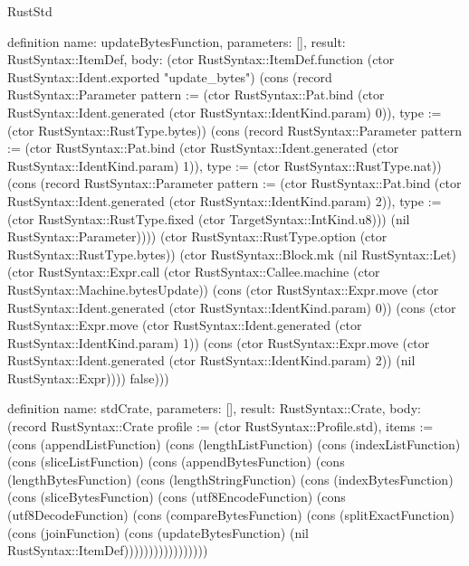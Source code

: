 \begin{lexlean}{RustStd}
\begin{semanticmodule}
definition{
  name: updateBytesFunction,
  parameters: [],
  result: RustSyntax::ItemDef,
  body: (ctor RustSyntax::ItemDef.function (ctor RustSyntax::Ident.exported "update_bytes") (cons (record RustSyntax::Parameter {pattern := (ctor RustSyntax::Pat.bind (ctor RustSyntax::Ident.generated (ctor RustSyntax::IdentKind.param) 0)), type := (ctor RustSyntax::RustType.bytes)}) (cons (record RustSyntax::Parameter {pattern := (ctor RustSyntax::Pat.bind (ctor RustSyntax::Ident.generated (ctor RustSyntax::IdentKind.param) 1)), type := (ctor RustSyntax::RustType.nat)}) (cons (record RustSyntax::Parameter {pattern := (ctor RustSyntax::Pat.bind (ctor RustSyntax::Ident.generated (ctor RustSyntax::IdentKind.param) 2)), type := (ctor RustSyntax::RustType.fixed (ctor TargetSyntax::IntKind.u8))}) (nil RustSyntax::Parameter)))) (ctor RustSyntax::RustType.option (ctor RustSyntax::RustType.bytes)) (ctor RustSyntax::Block.mk (nil RustSyntax::Let) (ctor RustSyntax::Expr.call (ctor RustSyntax::Callee.machine (ctor RustSyntax::Machine.bytesUpdate)) (cons (ctor RustSyntax::Expr.move (ctor RustSyntax::Ident.generated (ctor RustSyntax::IdentKind.param) 0)) (cons (ctor RustSyntax::Expr.move (ctor RustSyntax::Ident.generated (ctor RustSyntax::IdentKind.param) 1)) (cons (ctor RustSyntax::Expr.move (ctor RustSyntax::Ident.generated (ctor RustSyntax::IdentKind.param) 2)) (nil RustSyntax::Expr)))) false)))
}

definition{
  name: stdCrate,
  parameters: [],
  result: RustSyntax::Crate,
  body: (record RustSyntax::Crate {profile := (ctor RustSyntax::Profile.std), items := (cons (appendListFunction) (cons (lengthListFunction) (cons (indexListFunction) (cons (sliceListFunction) (cons (appendBytesFunction) (cons (lengthBytesFunction) (cons (lengthStringFunction) (cons (indexBytesFunction) (cons (sliceBytesFunction) (cons (utf8EncodeFunction) (cons (utf8DecodeFunction) (cons (compareBytesFunction) (cons (splitExactFunction) (cons (joinFunction) (cons (updateBytesFunction) (nil RustSyntax::ItemDef))))))))))))))))})
}


\end{semanticmodule}
\end{lexlean}
